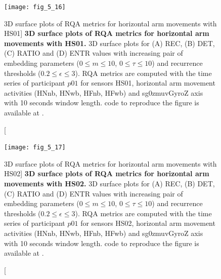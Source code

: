 \begin{figure}
\centering
\texttt{[image: fig\_5\_16]}
    \caption
	[3D surface plots of RQA metrics for horizontal arm movements with HS01]{
	{\bf 3D surface plots of RQA metrics for horizontal arm movements with HS01.}
	3D surface plots for (A) REC, (B) DET, (C) RATIO and (D) ENTR values 
	with increasing pair of embedding parameters 
	($0 \le m \le 10$, $0 \le \tau \le 10$) 
	and recurrence thresholds ($ 0.2 \le \epsilon \le 3 $).
	RQA metrics are computed with the time series of participant $p01$ 
	for sensors HS01, horizontal arm movement activities 
	(HNnb, HNwb, HFnb, HFwb) and 
	sg0zmuvGyroZ axis with 10 seconds window length. 
	\R code to reproduce the figure is available at 
	.
	}
\label{fig:topo_s_hs01_H_w500}
\end{figure}

\begin{figure}
\centering
\texttt{[image: fig\_5\_17]}
    \caption
	[3D surface plots of RQA metrics for horizontal arm movements with HS02]{
	{\bf 3D surface plots of RQA metrics for horizontal arm movements with HS02.}
	3D surface plots for (A) REC, (B) DET, (C) RATIO and (D) ENTR values 
	with increasing pair of embedding parameters 
	($0 \le m \le 10$, $0 \le \tau \le 10$) 
	and recurrence thresholds ($ 0.2 \le \epsilon \le 3 $).
	RQA metrics are computed with the time series of participant $p01$ 
	for sensors HS02, horizontal arm movement activities 
	(HNnb, HNwb, HFnb, HFwb) and 
	sg0zmuvGyroZ axis with 10 seconds window length. 
 	\R code to reproduce the figure is available at 
	.
	}
\label{fig:topo_s_hs02_H_w500}
\end{figure}

